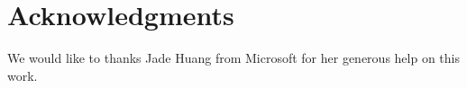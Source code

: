\section*{Acknowledgments}
\label{sec:akn}

We would like to thanks Jade Huang from Microsoft for her generous help on this work.